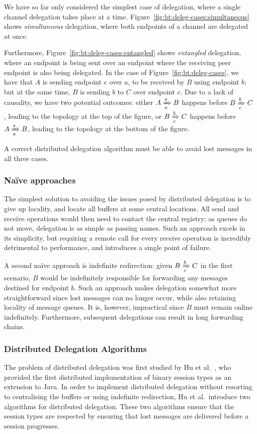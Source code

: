 \documentclass[
graybox,
envcountchap
]{svmult}
\begin{document}
\begin{bibunit}
  We have so far only considered the simplest case of delegation, where a single
  channel delegation takes place at a time.
  Figure~\ref{fig:bt:deleg-cases:simultaneous} shows \emph{simultaneous}
  delegation, where both endpoints of a channel are delegated at once.

  Furthermore, Figure~\ref{fig:bt:deleg-cases:entangled} shows \emph{entangled}
  delegation, where an endpoint is being sent over an endpoint where the
  receiving peer endpoint is also being delegated. In the case of
  Figure~\ref{fig:bt:deleg-cases}, we have that $A$ is sending endpoint $e$ over
  $a$, to be received by $B$ using endpoint $b$; but at the same time, $B$ is
  sending $b$ to $C$ over endpoint $c$. Due to a lack of causality, we have two
  potential outcomes: either $\triestosend{A}{e}{B}{a}$ happens before
  $\triestosend{B}{b}{C}{c}$, leading to the topology at the top of the figure,
  or $\triestosend{B}{b}{C}{c}$ happens before $\triestosend{A}{e}{B}{a}$,
  leading to the topology at the bottom of the figure.

  A correct distributed delegation algorithm must be able to avoid lost messages
  in all three cases.

  \subsubsection{Na\"ive approaches}
  The simplest solution to avoiding the issues posed by distributed delegation
  is to give up locality, and locate all buffers at some central locations. All
  send and receive operations would then need to contact the central registry;
  as queues do not move, delegation is as simple as passing names. Such an
  approach excels in its simplicity, but requiring a remote call for every
  receive operation is incredibly detrimental to performance, and introduces a
  single point of failure.

  A second na\"ive approach is indefinite redirection: given
  $\triestosend{B}{b}{C}{c}$ in the first scenario, $B$ would be indefinitely
  responsible for forwarding any messages destined for endpoint $b$. Such an
  approach makes delegation somewhat more straightforward since lost messages
  can no longer occur, while also retaining locality of message queues. It is,
  however, impractical since $B$ must remain online indefinitely. Furthermore,
  subsequent delegations can result in long forwarding chains.

  \subsubsection{Distributed Delegation Algorithms}
  The problem of distributed delegation was first studied by Hu et
  al.~\cite{HuYH08:session-java}, who provided the first distributed
  implementation of binary session types as an extension to Java. In order to
  implement distributed delegation without resorting to centralising the
  buffers or using indefinite redirection, Hu et al.\ introduce two algorithms
  for distributed delegation. These two algorithms ensure that the session types
  are respected by ensuring that lost messages are delivered before a session
  progresses.


\end{bibunit}
\end{document}

